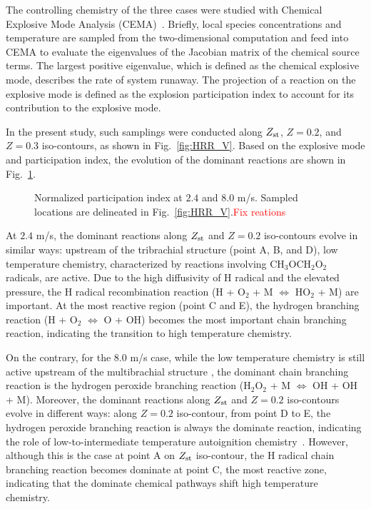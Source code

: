 \documentclass{wssci}
\begin{document}
The controlling chemistry of the three cases were studied with Chemical Explosive Mode Analysis (CEMA)~\cite{lu10,shan12}.   Briefly, local species concentrations and temperature are sampled from the two-dimensional computation and feed into CEMA to evaluate the eigenvalues of the Jacobian matrix of the chemical source terms.  The largest positive eigenvalue, which is defined as the chemical explosive mode, describes the rate of system runaway.  The projection of a reaction on the explosive mode is defined as the explosion participation index to account for its contribution to the explosive mode.

In the present study, such samplings were conducted along $Z_{\rm st}$, $Z = 0.2$, and $Z = 0.3$ iso-contours, as shown in Fig.~\ref{fig:HRR_V}.  Based on the explosive mode and participation index, the evolution of the dominant reactions are shown in Fig.~\ref{fig:CEMA_V}.

\begin{figure}
  \centering
  \scriptsize
  
  
  \normalsize
  \caption{Normalized participation index at $2.4$ and $8.0$ m/s.  Sampled locations are delineated in Fig.~\ref{fig:HRR_V}.\textcolor{red}{Fix reations}}
  \label{fig:CEMA_V}
\end{figure}

At $2.4$ m/s, the dominant reactions along $Z_{\rm st}$ and $Z = 0.2$ iso-contours evolve in similar ways: upstream of the tribrachial structure (point A, B, and D), low temperature chemistry, characterized by reactions involving CH$_3$OCH$_2$O$_2$ radicals, are active.  Due to the high diffusivity of H radical and the elevated pressure, the H radical recombination reaction (H + O$_2$ + M $\Longleftrightarrow$ HO$_2$ + M) are important.  At the most reactive region (point C and E), the hydrogen branching reaction (H + O$_2$ $\Longleftrightarrow$ O + OH) becomes the most important chain branching reaction, indicating the transition to high temperature chemistry.

On the contrary, for the $8.0$ m/s case, while the low temperature chemistry is still active upstream of the multibrachial structure , the dominant chain branching reaction is the hydrogen peroxide branching reaction (H$_2$O$_2$ + M $\Longleftrightarrow$ OH + OH + M).  Moreover, the dominant reactions along $Z_{\rm st}$ and $Z = 0.2$ iso-contours evolve in different ways: along $Z = 0.2$ iso-contour, from point D to E, the hydrogen peroxide branching reaction is always the dominate reaction, indicating the role of low-to-intermediate temperature autoignition chemistry~\cite{westbrook00}.  However, although this is the case at point A on $Z_{\rm st}$ iso-contour, the H radical chain branching reaction becomes dominate at point C, the most reactive zone, indicating that the dominate chemical pathways shift high temperature chemistry.  
\end{document}
